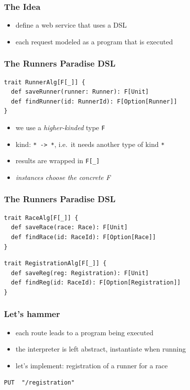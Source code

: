 \documentclass{beamer}
\begin{document}
\begin{frame}
  \frametitle{The Idea}
  \begin{itemize}
  \item define a web service that uses a DSL
  \item each request modeled as a program that is executed
  \end{itemize}
\end{frame}

\begin{frame}[fragile]
  \frametitle{The Runners Paradise DSL}
\begin{verbatim}
trait RunnerAlg[F[_]] {
  def saveRunner(runner: Runner): F[Unit]
  def findRunner(id: RunnerId): F[Option[Runner]]
}
\end{verbatim}
  \begin{itemize}
  \item we use a \textit{higher-kinded} type \texttt{F}
  \item kind: \texttt{* -> *}, i.e.\ it needs another type of kind
    \texttt{*}
  \item results are wrapped in \texttt{F[\_]}
  \item \textit{instances choose the concrete F}
  \end{itemize}
\end{frame}

\begin{frame}[fragile]
  \frametitle{The Runners Paradise DSL}
\begin{verbatim}
trait RaceAlg[F[_]] {
  def saveRace(race: Race): F[Unit]
  def findRace(id: RaceId): F[Option[Race]]
}
\end{verbatim}
\begin{verbatim}
trait RegistrationAlg[F[_]] {
  def saveReg(reg: Registration): F[Unit]
  def findReg(id: RaceId): F[Option[Registration]]
}
\end{verbatim}
\end{frame}

\begin{frame}[fragile]
  \frametitle{Let's hammer}
  \begin{itemize}
  \item each route leads to a program being executed
  \item the interpreter is left abstract, instantiate when running
  \item let's implement: registration of a runner for a race
  \end{itemize}
  \vfill
\begin{verbatim}
PUT  "/registration"
\end{verbatim}
\end{frame}
\end{document}
